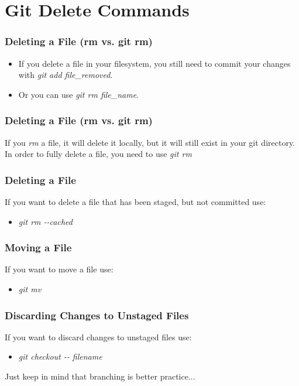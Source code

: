 
\section[Deleting]{Git Delete Commands}

\begin{frame}
\frametitle{\large Deleting a File (rm vs. git rm)}
\begin{itemize}
\item If you delete a file in your filesystem, you still need to commit your changes with \emph{git add file\_removed}.
\item Or you can use \emph{git rm file\_name}.
\end{itemize}
\end{frame}
\note{}

\begin{frame}
\frametitle{\large Deleting a File (rm vs. git rm)}
If you \emph{rm} a file, it will delete it locally, but it will still exist in your git directory. In order to fully delete a file, you need to use \emph{git rm}
\end{frame}

\begin{frame}
\frametitle{\large Deleting a File}
If you want to delete a file that has been staged, but not committed use:
\begin{itemize}
\item \emph{git rm -{}-cached}
\end{itemize}
\end{frame}
\note{}

\begin{frame}
\frametitle{\large Moving a File}
If you want to move a file use:
\begin{itemize}
\item \emph{git mv}
\end{itemize}
\end{frame}
\note{}

\begin{frame}
\frametitle{\large Discarding Changes to Unstaged Files}
If you want to discard changes to unstaged files use:
\begin{itemize}
\item \emph{git checkout -{}- filename}
\end{itemize}
Just keep in mind that branching is better practice...
\end{frame}
\note{}

